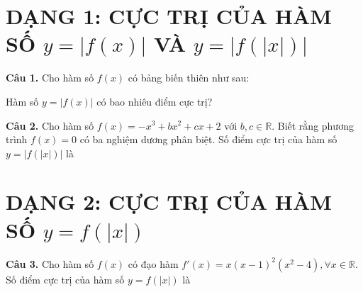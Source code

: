 \documentclass[12pt,a4paper]{article}
\begin{document}
\section*{DẠNG 1: CỰC TRỊ CỦA HÀM SỐ $y=|f(x)|$ VÀ $y=|f(|x|)|$}


\textbf{Câu 1.}  Cho hàm số $f(x)$ có bảng biến thiên như sau:
\begin{center}
\end{center}
Hàm số $y=|f(x)|$ có bao nhiêu điểm cực trị?



\textbf{Câu 2.}  Cho hàm số $f(x)=-x^3+bx^2+cx+2$ với $b,c\in\mathbb{R}$. Biết rằng phương trình $f(x)=0$ có ba nghiệm dương phân biệt. Số điểm cực trị của hàm số $y=|f(|x|)|$ là
\section*{DẠNG 2: CỰC TRỊ CỦA HÀM SỐ $y=f(|x|)$}


\textbf{Câu 3.}  Cho hàm số $f(x)$ có đạo hàm $f'(x)=x(x-1)^2(x^2-4),\forall x\in\mathbb{R}$. Số điểm cực trị của hàm số $y=f(|x|)$ là
\end{document}
